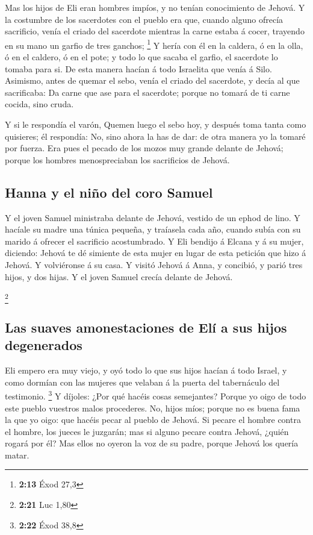  Mas los hijos de Eli eran hombres impíos, y no tenían
conocimiento de Jehová.  Y la costumbre de los sacerdotes
con el pueblo era que, cuando alguno ofrecía sacrificio, venía el criado
del sacerdote mientras la carne estaba á cocer, trayendo en su mano un
garfio de tres ganchos; \footnote{\textbf{2:13} Éxod 27,3} 
Y hería con él en la caldera, ó en la olla, ó en el caldero, ó en el
pote; y todo lo que sacaba el garfio, el sacerdote lo tomaba para si. De
esta manera hacían á todo Israelita que venía á Silo. 
Asimismo, antes de quemar el sebo, venía el criado del sacerdote, y
decía al que sacrificaba: Da carne que ase para el sacerdote; porque no
tomará de ti carne cocida, sino cruda.

 Y si le respondía el varón, Quemen luego el sebo hoy, y
después toma tanta como quisieres; él respondía: No, sino ahora la has
de dar: de otra manera yo la tomaré por fuerza.  Era pues
el pecado de los mozos muy grande delante de Jehová; porque los hombres
menospreciaban los sacrificios de Jehová.

\hypertarget{hanna-y-el-niuxf1o-del-coro-samuel}{%
\subsection{Hanna y el niño del coro
Samuel}\label{hanna-y-el-niuxf1o-del-coro-samuel}}

 Y el joven Samuel ministraba delante de Jehová, vestido de
un ephod de lino.  Y hacíale su madre una túnica pequeña, y
traíasela cada año, cuando subía con su marido á ofrecer el sacrificio
acostumbrado.  Y Eli bendijo á Elcana y á su mujer,
diciendo: Jehová te dé simiente de esta mujer en lugar de esta petición
que hizo á Jehová. Y volviéronse á su casa.  Y visitó
Jehová á Anna, y concibió, y parió tres hijos, y dos hijas. Y el joven
Samuel crecía delante de Jehová.

\footnote{\textbf{2:21} Luc 1,80}

\hypertarget{las-suaves-amonestaciones-de-eluxed-a-sus-hijos-degenerados}{%
\subsection{Las suaves amonestaciones de Elí a sus hijos
degenerados}\label{las-suaves-amonestaciones-de-eluxed-a-sus-hijos-degenerados}}

 Eli empero era muy viejo, y oyó todo lo que sus hijos
hacían á todo Israel, y como dormían con las mujeres que velaban á la
puerta del tabernáculo del testimonio. \footnote{\textbf{2:22} Éxod 38,8}
 Y díjoles: ¿Por qué hacéis cosas semejantes? Porque yo
oigo de todo este pueblo vuestros malos procederes.  No,
hijos míos; porque no es buena fama la que yo oigo: que hacéis pecar al
pueblo de Jehová.  Si pecare el hombre contra el hombre,
los jueces le juzgarán; mas si alguno pecare contra Jehová, ¿quién
rogará por él? Mas ellos no oyeron la voz de su padre, porque Jehová los
quería matar.

